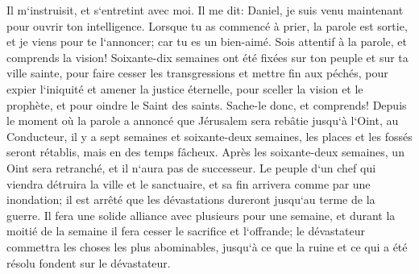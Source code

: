 \verse Il m`instruisit, et s`entretint avec moi. Il me dit: Daniel, je suis venu maintenant pour ouvrir ton intelligence. 
\verse Lorsque tu as commencé à prier, la parole est sortie, et je viens pour te l`annoncer; car tu es un bien-aimé. Sois attentif à la parole, et comprends la vision! 
\verse Soixante-dix semaines ont été fixées sur ton peuple et sur ta ville sainte, pour faire cesser les transgressions et mettre fin aux péchés, pour expier l`iniquité et amener la justice éternelle, pour sceller la vision et le prophète, et pour oindre le Saint des saints. 
\verse Sache-le donc, et comprends! Depuis le moment où la parole a annoncé que Jérusalem sera rebâtie jusqu`à l`Oint, au Conducteur, il y a sept semaines et soixante-deux semaines, les places et les fossés seront rétablis, mais en des temps fâcheux. 
\verse Après les soixante-deux semaines, un Oint sera retranché, et il n`aura pas de successeur. Le peuple d`un chef qui viendra détruira la ville et le sanctuaire, et sa fin arrivera comme par une inondation; il est arrêté que les dévastations dureront jusqu`au terme de la guerre. 
\verse Il fera une solide alliance avec plusieurs pour une semaine, et durant la moitié de la semaine il fera cesser le sacrifice et l`offrande; le dévastateur commettra les choses les plus abominables, jusqu`à ce que la ruine et ce qui a été résolu fondent sur le dévastateur. 

